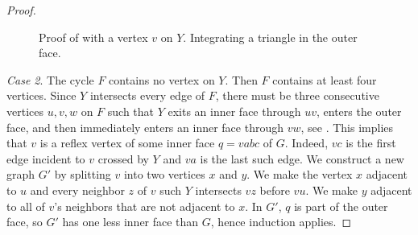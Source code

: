 \begin{proof}
	\begin{figure}[htb]
		\caption{Proof of  with a vertex
			$v$ on $Y$. Integrating a triangle in the outer face.}
	\end{figure}
	
	
	
	
	{\em Case 2}. The cycle $F$ contains no vertex on $Y$.
	Then $F$ contains at least four vertices. Since $Y$ intersects
	every edge of $F$, there must be %
        three consecutive vertices
	$u,v,w$ on $F$ such that $Y$ exits an inner face through $uv$, enters the outer face, and then immediately enters
	an inner face through $vw$, see .
	This implies that $v$ is a reflex vertex
	of some inner face $q=vabc$ of $G$.  Indeed, $vc$ is the first edge
	incident to $v$ crossed by $Y$ and $va$ is the last such edge.
	We construct a new graph $G'$ by splitting $v$ into two vertices $x$
	and $y$. We make the vertex $x$ adjacent to $u$ and every neighbor
	$z$ of $v$ such $Y$ intersects $vz$ before $vu$.  We make
	$y$ adjacent to all of $v$'s neighbors that are not adjacent to $x$.
	In $G'$, $q$ is part of the outer face, so $G'$ has one less inner
	face than $G$, hence induction applies.
	

\end{proof}
